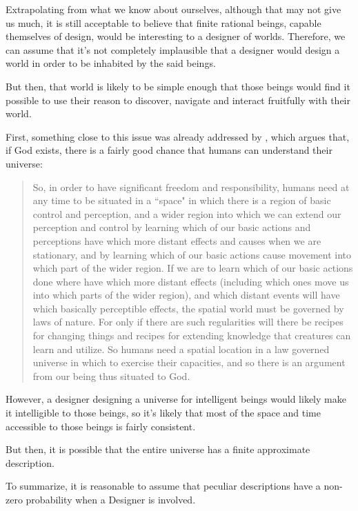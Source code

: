 \documentclass[a4paper
,draft
]{article}
\newcommand{\svn}[2][]{\todo[author=Virgil,color=red!25!white,#1]{#2}}
\newcommand{\ghilimele}[1]{``#1"}
\begin{document}
Extrapolating from what we know about ourselves, although that may
not give us much, it is still acceptable to believe that
finite rational beings,
capable themselves of design, would be interesting to a designer of worlds.
Therefore, we can assume that it's not completely implausible that a designer
would design a world in order to be inhabited by the said beings.

But then, that world is likely to be simple enough that
those beings would find it possible to use their reason to
discover, navigate and interact fruitfully with their world.
\svn{Hidden assumption that those beings are finite.}

First, something close to this issue was already addressed by
\textcite{Swinburne2003}, which argues that, if God exists,
there is a fairly good chance that humans can understand their universe:

\begin{quote}
  So, in order to have significant freedom and responsibility, humans need
  at any time to be situated in a \ghilimele{space} in which there is a
  region of basic control and perception, and a wider region into which
  we can extend our perception and control by learning which of our
  basic actions and perceptions have which more distant effects and causes
  when we are stationary, and by learning which of our basic actions cause
  movement into which part of the wider region.
  If we are to learn which of our basic actions done where have which
  more distant effects (including which ones move us into which parts
  of the wider region), and which distant events will have which basically
  perceptible effects, the spatial world must be governed by laws of nature.
  For only if there are such regularities will there be recipes for changing
  things and recipes for extending knowledge that creatures can learn and
  utilize.
  So humans need a spatial location in a law governed universe in which to
  exercise their capacities, and so there is an argument from our being thus
  situated to God.
\end{quote}

However, a designer designing a universe for intelligent beings would likely
make it intelligible to those beings, so it's likely that most of
the space and time accessible to those beings is fairly consistent.

But then, it is possible that the entire universe has a finite approximate
description.

To summarize, it is reasonable to assume that peculiar descriptions have
a non-zero probability when a Designer is involved.
\end{document}
